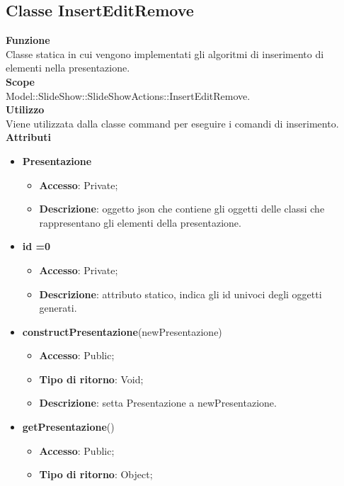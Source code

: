 \subsection{Classe InsertEditRemove}{
		\textbf{Funzione}\\
			\indent Classe statica in cui vengono implementati gli algoritmi di inserimento di elementi nella presentazione.\\
	   	\textbf{Scope}\\
			\indent Model::SlideShow::SlideShowActions::InsertEditRemove.\\
		\textbf{Utilizzo}\\
			\indent Viene utilizzata dalla classe command per eseguire i comandi di inserimento.\\
		\textbf{Attributi}
		\begin{itemize}
			\item \textbf{Presentazione}
			\begin{itemize}
				\item \textbf{Accesso}: Private;
				\item \textbf{Descrizione}: oggetto json che contiene gli oggetti delle classi che rappresentano gli elementi della presentazione.
			\end{itemize}
			\item \textbf{id =0}
			\begin{itemize}
				\item \textbf{Accesso}: Private;
				\item \textbf{Descrizione}: attributo statico, indica gli id univoci degli oggetti generati.
			\end{itemize}
		\end{itemize}
		\begin{itemize}
			\item \textbf{constructPresentazione}(newPresentazione)
			\begin{itemize}
				\item \textbf{Accesso}: Public;
				\item \textbf{Tipo di ritorno}: Void;
				\item \textbf{Descrizione}: setta Presentazione a newPresentazione.
			\end{itemize}
			\item \textbf{getPresentazione}()
			\begin{itemize}
				\item \textbf{Accesso}: Public;
				\item \textbf{Tipo di ritorno}: Object;

\end{itemize}
\end{itemize}}

